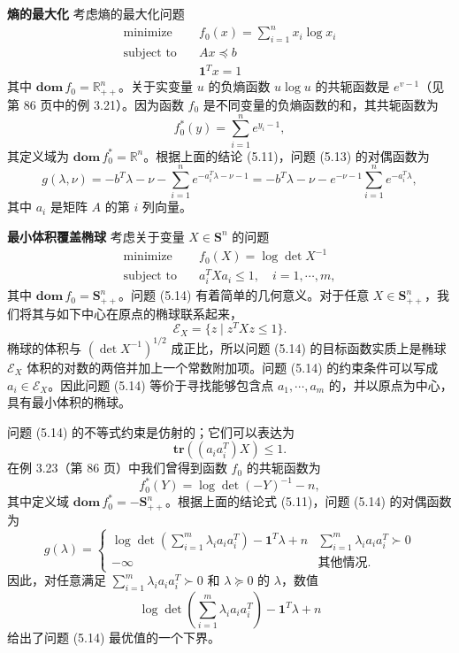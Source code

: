 \documentclass[UTF8, 12pt, fontset=fandol, oneside]{ctexart}
\begin{document}
\noindent\textbf{熵的最大化}\quad
考虑熵的最大化问题
\begin{equation}
\begin{aligned}
\text{minimize}\quad & f_0(x)=\sum_{i=1}^n x_i\log x_i\\
\text{subject to}\quad & Ax\preceq b\\
& \mathbf{1}^Tx=1
\end{aligned}
\tag{5.13}
\end{equation}
其中 $\mathbf{dom}\,f_0=\mathbb{R}_{++}^n$。关于实变量 $u$ 的负熵函数 $u\log u$ 的共轭函数是 $e^{v-1}$（见第 86 页中的例 3.21）。因为函数 $f_0$ 是不同变量的负熵函数的和，其共轭函数为
\[
f_0^\ast(y)=\sum_{i=1}^n e^{y_i-1},
\]
其定义域为 $\mathbf{dom}\,f_0^\ast=\mathbb{R}^n$。根据上面的结论 (5.11)，问题 (5.13) 的对偶函数为
\[
g(\lambda,\nu)=-b^T\lambda-\nu-\sum_{i=1}^n e^{-a_i^T\lambda-\nu-1}
=-b^T\lambda-\nu-e^{-\nu-1}\sum_{i=1}^n e^{-a_i^T\lambda},
\]
其中 $a_i$ 是矩阵 $A$ 的第 $i$ 列向量。

\noindent\textbf{最小体积覆盖椭球}\quad
考虑关于变量 $X\in\mathbf{S}^n$ 的问题
\begin{equation}
\begin{aligned}
\text{minimize}\quad & f_0(X)=\log\det X^{-1}\\
\text{subject to}\quad & a_i^T X a_i\leq 1,\quad i=1,\cdots,m,
\end{aligned}
\tag{5.14}
\end{equation}
其中 $\mathbf{dom}\,f_0=\mathbf{S}_{++}^n$。问题 (5.14) 有着简单的几何意义。对于任意 $X\in\mathbf{S}_{++}^n$，我们将其与如下中心在原点的椭球联系起来，
\[
\mathcal{E}_X=\{z\mid z^T X z\leq 1\}.
\]
椭球的体积与 $(\det X^{-1})^{1/2}$ 成正比，所以问题 (5.14) 的目标函数实质上是椭球 $\mathcal{E}_X$ 体积的对数的两倍并加上一个常数附加项。问题 (5.14) 的约束条件可以写成 $a_i\in\mathcal{E}_X$。因此问题 (5.14) 等价于寻找能够包含点 $a_1,\cdots,a_m$ 的，并以原点为中心，具有最小体积的椭球。

问题 (5.14) 的不等式约束是仿射的；它们可以表达为
\[
\mathbf{tr}\left((a_i a_i^T)X\right)\leq 1.
\]
在例 3.23（第 86 页）中我们曾得到函数 $f_0$ 的共轭函数为
\[
f_0^\ast(Y)=\log\det(-Y)^{-1}-n,
\]
其中定义域 $\mathbf{dom}\,f_0^\ast=-\mathbf{S}_{++}^n$。根据上面的结论式 (5.11)，问题 (5.14) 的对偶函数为
\begin{equation}
g(\lambda)=
\begin{cases}
\log\det\left(\sum_{i=1}^m \lambda_i a_i a_i^T\right)-\mathbf{1}^T\lambda+n
& \displaystyle \sum_{i=1}^m \lambda_i a_i a_i^T\succ 0\\
-\infty & \text{其他情况}.
\end{cases}
\tag{5.15}
\end{equation}
因此，对任意满足 $\sum_{i=1}^m\lambda_i a_i a_i^T\succ 0$ 和 $\lambda\succeq 0$ 的 $\lambda$，数值
\[
\log\det\left(\sum_{i=1}^m \lambda_i a_i a_i^T\right)-\mathbf{1}^T\lambda+n
\]
给出了问题 (5.14) 最优值的一个下界。
\end{document}
